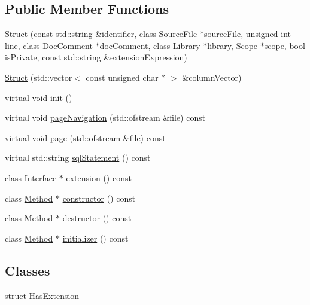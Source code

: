\subsection*{Public Member Functions}
\begin{CompactItemize}
\item 
\hyperlink{classvjassdoc_1_1Struct_3c985875cff8b6b41f1193aa0bdd124f}{Struct} (const std::string \&identifier, class \hyperlink{classvjassdoc_1_1SourceFile}{SourceFile} $\ast$sourceFile, unsigned int line, class \hyperlink{classvjassdoc_1_1DocComment}{DocComment} $\ast$docComment, class \hyperlink{classvjassdoc_1_1Library}{Library} $\ast$library, \hyperlink{classvjassdoc_1_1Scope}{Scope} $\ast$scope, bool isPrivate, const std::string \&extensionExpression)
\item 
\hyperlink{classvjassdoc_1_1Struct_577a9bb757bf7775389eb8e6e59dee1a}{Struct} (std::vector$<$ const unsigned char $\ast$ $>$ \&columnVector)
\item 
virtual void \hyperlink{classvjassdoc_1_1Struct_39dc86da31e526f3a6eb3b6e442156bb}{init} ()
\item 
virtual void \hyperlink{classvjassdoc_1_1Struct_c415c5b26f7385a990339dfbfbbca5dc}{pageNavigation} (std::ofstream \&file) const 
\item 
virtual void \hyperlink{classvjassdoc_1_1Struct_bd918c5a1ec7defe1849f4b4e61523f2}{page} (std::ofstream \&file) const 
\item 
virtual std::string \hyperlink{classvjassdoc_1_1Struct_227d826acdbbe1702941634c90ab7e4e}{sqlStatement} () const 
\item 
class \hyperlink{classvjassdoc_1_1Interface}{Interface} $\ast$ \hyperlink{classvjassdoc_1_1Struct_92ef4086c680565cd9c5766607d8a560}{extension} () const 
\item 
class \hyperlink{classvjassdoc_1_1Method}{Method} $\ast$ \hyperlink{classvjassdoc_1_1Struct_41a8c77e86a5a04ee3e594c58e0f4ceb}{constructor} () const 
\item 
class \hyperlink{classvjassdoc_1_1Method}{Method} $\ast$ \hyperlink{classvjassdoc_1_1Struct_f4c2781402019fade0e674abbd5f161b}{destructor} () const 
\item 
class \hyperlink{classvjassdoc_1_1Method}{Method} $\ast$ \hyperlink{classvjassdoc_1_1Struct_234bd98d0902f34047f17f005a5f1dbe}{initializer} () const 
\end{CompactItemize}
\subsection*{Classes}
\begin{CompactItemize}
\item 
struct \hyperlink{structvjassdoc_1_1Struct_1_1HasExtension}{HasExtension}
\end{CompactItemize}


